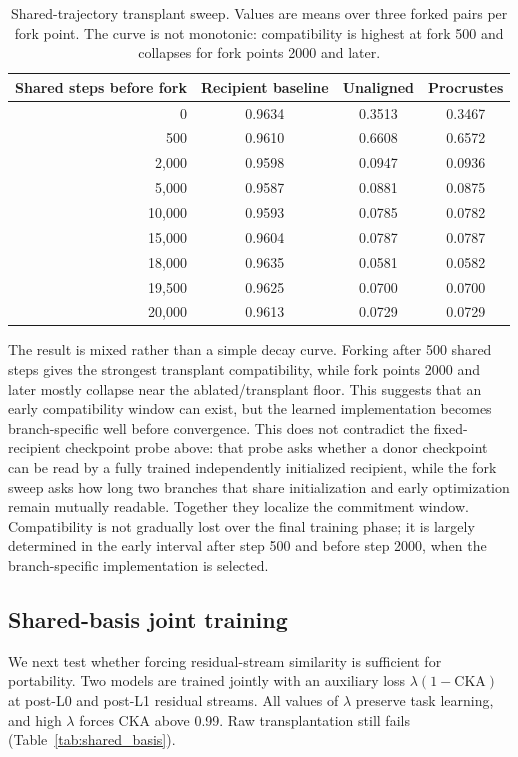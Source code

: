 \documentclass[final]{article}
\begin{document}
\begin{table}[h]
\centering
\caption{Shared-trajectory transplant sweep. Values are means over three forked
pairs per fork point. The curve is not monotonic: compatibility is highest at
fork 500 and collapses for fork points 2000 and later.}
\label{tab:shared_trajectory}
\begin{tabular}{rccc}
\toprule
Shared steps before fork & Recipient baseline & Unaligned & Procrustes \\
\midrule
0 & 0.9634 & 0.3513 & 0.3467 \\
500 & 0.9610 & 0.6608 & 0.6572 \\
2{,}000 & 0.9598 & 0.0947 & 0.0936 \\
5{,}000 & 0.9587 & 0.0881 & 0.0875 \\
10{,}000 & 0.9593 & 0.0785 & 0.0782 \\
15{,}000 & 0.9604 & 0.0787 & 0.0787 \\
18{,}000 & 0.9635 & 0.0581 & 0.0582 \\
19{,}500 & 0.9625 & 0.0700 & 0.0700 \\
20{,}000 & 0.9613 & 0.0729 & 0.0729 \\
\bottomrule
\end{tabular}
\end{table}

The result is mixed rather than a simple decay curve. Forking after 500 shared
steps gives the strongest transplant compatibility, while fork points 2000 and
later mostly collapse near the ablated/transplant floor. This suggests that an
early compatibility window can exist, but the learned implementation becomes
branch-specific well before convergence. This does not contradict the
fixed-recipient checkpoint probe above: that probe asks whether a donor
checkpoint can be read by a fully trained independently initialized recipient,
while the fork sweep asks how long two branches that share initialization and
early optimization remain mutually readable. Together they localize the
commitment window. Compatibility is not gradually lost over the final training
phase; it is largely determined in the early interval after step 500 and before
step 2000, when the branch-specific implementation is selected.

\subsection{Shared-basis joint training}
\label{sec:sharedbasis}

We next test whether forcing residual-stream similarity is sufficient for
portability. Two models are trained jointly with an auxiliary loss
$\lambda(1-\mathrm{CKA})$ at post-L0 and post-L1 residual streams. All values
of $\lambda$ preserve task learning, and high $\lambda$ forces CKA above 0.99.
Raw transplantation still fails (Table~\ref{tab:shared_basis}).
\end{document}

